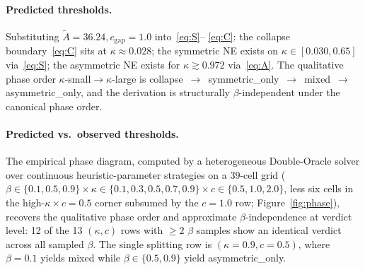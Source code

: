 \documentclass{anvil-paper}
\begin{document}
\paragraph{Predicted thresholds.}
Substituting $\tilde A{=}36.24,c_{\text{gap}}{=}1.0$ into~\eqref{eq:S}--%
\eqref{eq:C}: the collapse boundary~\eqref{eq:C} sits at
$\kappa\approx 0.028$; the symmetric NE exists on
$\kappa\in[0.030,0.65]$ via~\eqref{eq:S}; the asymmetric NE exists for
$\kappa\gtrsim 0.972$ via~\eqref{eq:A}. The qualitative phase order
$\kappa$-small$\to$$\kappa$-large is
\textsf{collapse}~$\to$~\textsf{symmetric\_only}~$\to$~\textsf{mixed}~$\to$~%
\textsf{asymmetric\_only}, and the derivation is structurally
$\beta$-independent under the canonical phase order.

\paragraph{Predicted vs.\ observed thresholds.}
The empirical phase diagram, computed by a heterogeneous Double-Oracle
solver over continuous heuristic-parameter strategies on a $39$-cell grid
($\beta\in\{0.1,0.5,0.9\}\times\kappa\in\{0.1,0.3,0.5,0.7,0.9\}\times
c\in\{0.5,1.0,2.0\}$, less six cells in the high-$\kappa\times c{=}0.5$
corner subsumed by the $c{=}1.0$ row; Figure~\ref{fig:phase}), recovers the
qualitative phase order and approximate $\beta$-independence at verdict
level: 12 of the 13 $(\kappa,c)$ rows with $\geq 2$ $\beta$ samples
show an identical verdict across all sampled $\beta$. The single
splitting row is $(\kappa{=}0.9, c{=}0.5)$, where $\beta{=}0.1$
yields \textsf{mixed} while $\beta\in\{0.5, 0.9\}$ yield
\textsf{asymmetric\_only}.
\end{document}
